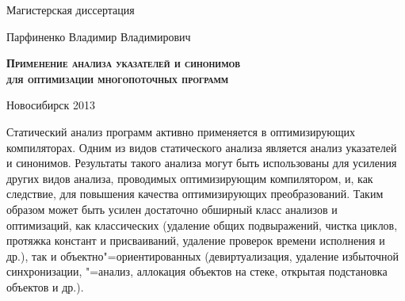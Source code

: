 \documentclass[14pt,titlepage,draft]{extarticle}
\begin{document}
\begin{center}
{      \vspace{1.2cm}

      Магистерская диссертация

      \vspace{0.5cm}

      {\large Парфиненко Владимир Владимирович \par}

      \vspace{1.1cm}

      {\large \scshape \bfseries
        Применение анализа указателей и синонимов\\
        для оптимизации многопоточных программ \par
      }

      \vspace{2.5cm}


      \hfill{}

      \vfill

      Новосибирск 2013
    }
  \end{center}

  \clearpage
  \listoftodos

  \tableofcontents


    Статический анализ программ активно применяется в оптимизирующих
    компиляторах. Одним из видов статического анализа является анализ
    указателей и синонимов. Результаты такого анализа могут быть использованы
    для усиления других видов анализа, проводимых оптимизирующим компилятором,
    и, как следствие, для повышения качества оптимизирующих преобразований.
    Таким образом может быть усилен достаточно обширный класс анализов и
    оптимизаций, как классических (удаление общих
    подвыражений, чистка циклов, протяжка констант и присваиваний, удаление
    проверок времени исполнения и др.), так и объектно"=ориентированных
    (девиртуализация, удаление избыточной синхронизации, "=анализ,
    аллокация объектов на стеке, открытая подстановка объектов и др.).
\end{document}
